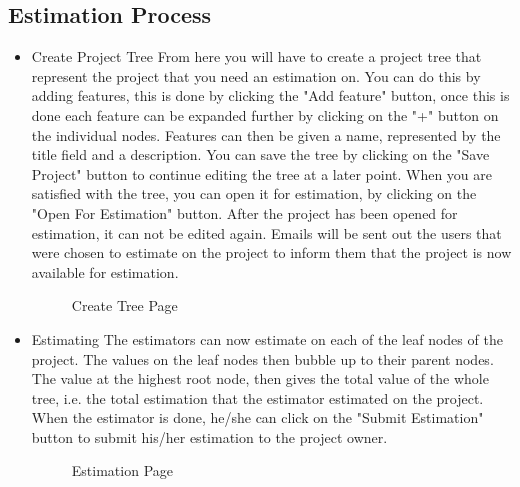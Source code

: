 \subsection{Estimation Process}
\begin{itemize}
	\item{Create Project Tree}
	\newline
	From here you will have to create a project tree that represent the project that you need an estimation on. You can do this by adding features, this is done by clicking the "Add feature" button, once this is done each feature can be expanded further by clicking on the "+" button on the individual nodes. Features can then be given a name, represented by the title field and a description. You can save the tree by clicking on the "Save Project" button to continue editing the tree at a later point. When you are satisfied with the tree, you can open it for estimation, by clicking on the "Open For Estimation" button. After the project has been opened for estimation, it can not be edited again. Emails will be sent out the users that were chosen to estimate on the project to inform them that the project is now available for estimation.
	\begin{figure}[H]
	    	\centering
	    	\caption{Create Tree Page}
	    	\label{fig:Learning rate 0.1}
   	\end{figure}
	\item{Estimating}
	\newline
	The estimators can now estimate on each of the leaf nodes of the project. The values on the leaf nodes then bubble up to their parent nodes. The value at the highest root node, then gives the total value of the whole tree, i.e. the total estimation that the estimator estimated on the project. When the estimator is done, he/she can click on the "Submit Estimation" button to submit his/her estimation to the project owner.
	\begin{figure}[H]
	    	\centering
	    	\caption{Estimation Page}
	    	\label{fig:Learning rate 0.1}
   	\end{figure}
\end{itemize}
